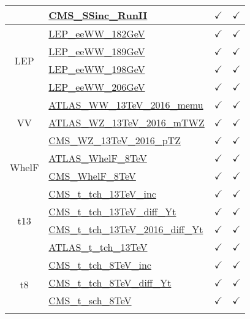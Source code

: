 \documentclass{article}
\begin{document}
\begin{table}[H]
\begin{tabular}{|c|l|c|c|}
 & \href{https://arxiv.org/abs/1809.10733}{CMS_SSinc_RunII}  & $\checkmark$ & $\checkmark$
\\ \hline
\multirow{4}{*}{LEP}
 & \href{https://arxiv.org/abs/1302.3415}{LEP_eeWW_182GeV}  & $\checkmark$ & $\checkmark$\\ \cline{2-4}
 & \href{https://arxiv.org/abs/1302.3415}{LEP_eeWW_189GeV}  & $\checkmark$ & $\checkmark$\\ \cline{2-4}
 & \href{https://arxiv.org/abs/1302.3415}{LEP_eeWW_198GeV}  & $\checkmark$ & $\checkmark$\\ \cline{2-4}
 & \href{https://arxiv.org/abs/1302.3415}{LEP_eeWW_206GeV}  & $\checkmark$ & $\checkmark$
\\ \hline
\multirow{3}{*}{VV}
 & \href{https://arxiv.org/abs/1905.04242}{ATLAS_WW_13TeV_2016_memu}  & $\checkmark$ & $\checkmark$\\ \cline{2-4}
 & \href{https://arxiv.org/abs/1902.05759}{ATLAS_WZ_13TeV_2016_mTWZ}  & $\checkmark$ & $\checkmark$\\ \cline{2-4}
 & \href{https://arxiv.org/abs/1901.03428}{CMS_WZ_13TeV_2016_pTZ}  & $\checkmark$ & $\checkmark$
\\ \hline
\multirow{2}{*}{WhelF}
 & \href{https://arxiv.org/abs/1612.02577}{ATLAS_WhelF_8TeV}  & $\checkmark$ & $\checkmark$\\ \cline{2-4}
 & \href{https://arxiv.org/abs/1605.09047}{CMS_WhelF_8TeV}  & $\checkmark$ & $\checkmark$
\\ \hline
\multirow{4}{*}{t13}
 & \href{https://arxiv.org/abs/1610.00678}{CMS_t_tch_13TeV_inc}  & $\checkmark$ & $\checkmark$\\ \cline{2-4}
 & \href{https://cds.cern.ch/record/2151074}{CMS_t_tch_13TeV_diff_Yt}  & $\checkmark$ & $\checkmark$\\ \cline{2-4}
 & \href{https://arxiv.org/abs/1907.08330}{CMS_t_tch_13TeV_2016_diff_Yt}  & $\checkmark$ & $\checkmark$\\ \cline{2-4}
 & \href{https://arxiv.org/abs/1609.03920}{ATLAS_t_tch_13TeV}  & $\checkmark$ & $\checkmark$
\\ \hline
\multirow{5}{*}{t8}
 & \href{https://arxiv.org/abs/1403.7366}{CMS_t_tch_8TeV_inc}  & $\checkmark$ & $\checkmark$\\ \cline{2-4}
 & \href{https://cds.cern.ch/record/1956681}{CMS_t_tch_8TeV_diff_Yt}  & $\checkmark$ & $\checkmark$\\ \cline{2-4}
 & \href{https://arxiv.org/abs/1603.02555}{CMS_t_sch_8TeV}  & $\checkmark$ & $\checkmark$\\ \cline{2-4}

\end{tabular}
\end{table}
\end{document}
